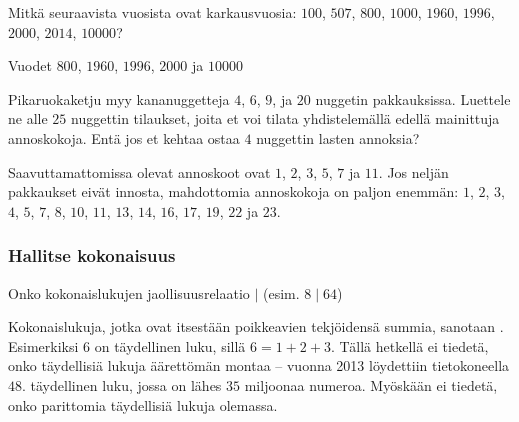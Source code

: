 \begin{tehtavasivu}
\begin{tehtava}
Mitkä seuraavista vuosista ovat karkausvuosia: $100$, $507$, $800$, $1000$, $1960$, $1996$, $2000$, $2014$, $10000$?
	\begin{vastaus}
	Vuodet $800$, $1960$, $1996$, $2000$ ja $10000$
	\end{vastaus}
\end{tehtava}

\begin{tehtava}
Pikaruokaketju myy kananuggetteja $4$, $6$, $9$, ja $20$ nuggetin pakkauksissa. Luettele ne alle $25$ nuggettin tilaukset, joita et voi tilata yhdistelemällä edellä mainittuja annoskokoja. Entä jos et kehtaa ostaa $4$ nuggettin lasten annoksia?
	\begin{vastaus}
		Saavuttamattomissa olevat annoskoot ovat $1$, $2$, $3$, $5$, $7$ ja $11$. Jos neljän pakkaukset eivät innosta, mahdottomia annoskokoja on paljon enemmän: $1$, $2$, $3$, $4$, $5$, $7$, $8$, $10$, $11$, $13$, $14$, $16$, $17$, $19$, $22$ ja $23$.
	\end{vastaus}
\end{tehtava}

\subsubsection*{Hallitse kokonaisuus}

\begin{tehtava}
Onko kokonaislukujen jaollisuusrelaatio $\mid$ (esim. $8\mid 64$)
	\begin{vastaus}
	\end{vastaus}
\end{tehtava}

\begin{tehtava}
Kokonaislukuja, jotka ovat itsestään poikkeavien tekjöidensä summia, sanotaan . Esimerkiksi $6$ on täydellinen luku, sillä $6=1+2+3$. Tällä hetkellä ei tiedetä, onko täydellisiä lukuja äärettömän montaa -- vuonna 2013 löydettiin tietokoneella $48.$ täydellinen luku, jossa on lähes $35$ miljoonaa numeroa. Myöskään ei tiedetä, onko parittomia täydellisiä lukuja olemassa.
	\begin{vastaus}
	\end{vastaus}
\end{tehtava}


\end{tehtavasivu}

